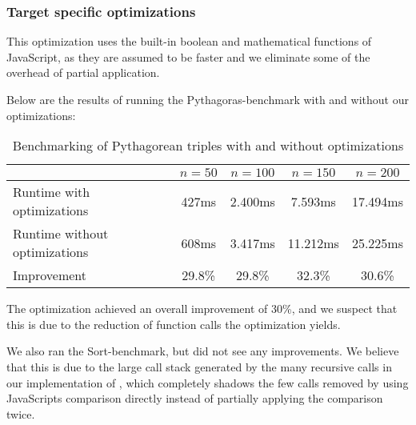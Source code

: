 \subsubsection{Target specific optimizations}

This optimization uses the built-in boolean and mathematical functions of JavaScript, as they are assumed to be faster and we eliminate some of the overhead of partial application.

Below are the results of running the Pythagoras-benchmark with and without our optimizations:

\begin{table}[h]
  \centering
  \begin{tabular}{|l|c|c|c|c|}
    \hline
                   & $n = 50$ & $n = 100$ & $n = 150$ & $n = 200$ \\
    \hline
    Runtime with optimizations & 427ms & 2.400ms  & 7.593ms & 17.494ms            \\
    Runtime without optimizations & 608ms & 3.417ms & 11.212ms  & 25.225ms             \\
    Improvement & 29.8\% & 29.8\% & 32.3\%  & 30.6\%             \\
    \hline
  \end{tabular}
  \caption{Benchmarking of Pythagorean triples with and without optimizations}
\end{table}

The optimization achieved an overall improvement of 30\%, and we suspect that this is due to the reduction of function calls the optimization yields.

We also ran the Sort-benchmark, but did not see any improvements. We believe that this is due to the large call stack generated by the many recursive calls in our implementation of , which completely shadows the few calls removed by using JavaScripts comparison directly instead of partially applying the comparison twice.
